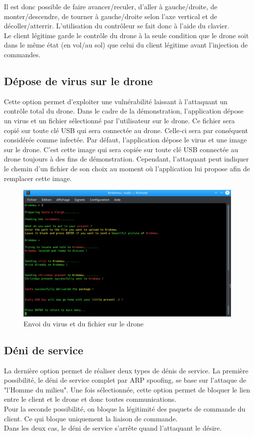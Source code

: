 Il est donc possible de faire avancer/reculer, d'aller à gauche/droite, de monter/descendre, de tourner à gauche/droite selon l'axe vertical et de décoller/atterrir. L'utilisation du contrôleur se fait donc à l'aide du clavier. \\
Le client légitime garde le contrôle du drone à la seule condition que le drone soit dans le même état (en vol/au sol) que celui du client légitime avant l'injection de commandes.

\subsection{Dépose de virus sur le drone}
Cette option permet d'exploiter une vulnérabilité laissant à l'attaquant un contrôle total du drone. Dans le cadre de la démonstration, l'application dépose un virus et un fichier sélectionné par l'utilisateur sur le drone. Ce fichier sera copié sur toute clé USB qui sera connectée au drone. Celle-ci sera par conséquent considérée comme infectée. Par défaut, l'application dépose le virus et une image sur le drone. C'est cette image qui sera copiée sur toute clé USB connectée au drone toujours à des fins de démonstration. Cependant, l'attaquant peut indiquer le chemin d'un fichier de son choix au moment où l'application lui propose afin de remplacer cette image.

\begin{figure}[H]
  \centering
  \includegraphics[scale=0.3]{images/virus.png}
  \caption{Envoi du virus et du fichier sur le drone}
\end{figure}

\subsection{Déni de service}
La dernière option permet de réaliser deux types de dénis de service. La première possibilité, le déni de service complet par ARP spoofing, se base sur l'attaque de "l'Homme du milieu". Une fois sélectionnée, cette option permet de bloquer le lien entre le client et le drone et donc toutes communications.\\
Pour la seconde possibilité, on bloque la légitimité des paquets de commande du client. Ce qui bloque uniquement la liaison de commande.\\
Dans les deux cas, le déni de service s'arrête quand l'attaquant le désire.


